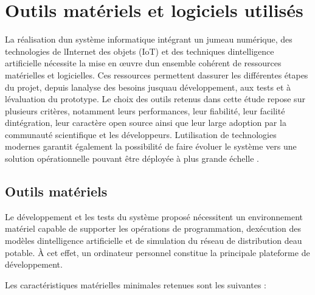 \section{Outils matériels et logiciels utilisés}\label{outils-matuxe9riels-et-logiciels-utilisuxe9s}

La réalisation d\textquotesingle un système informatique intégrant un
jumeau numérique, des technologies de l\textquotesingle Internet des
objets (IoT) et des techniques d\textquotesingle intelligence
artificielle nécessite la mise en œuvre d\textquotesingle un ensemble
cohérent de ressources matérielles et logicielles. Ces ressources
permettent d\textquotesingle assurer les différentes étapes du projet,
depuis l\textquotesingle analyse des besoins jusqu\textquotesingle au
développement, aux tests et à l\textquotesingle évaluation du prototype.
Le choix des outils retenus dans cette étude repose sur plusieurs
critères, notamment leurs performances, leur fiabilité, leur facilité
d\textquotesingle intégration, leur caractère open source ainsi que leur
large adoption par la communauté scientifique et les développeurs.
L\textquotesingle utilisation de technologies modernes garantit
également la possibilité de faire évoluer le système vers une solution
opérationnelle pouvant être déployée à plus grande échelle \cite{ref106}.

\subsection{Outils matériels}\label{outils-matuxe9riels}

Le développement et les tests du système proposé nécessitent un
environnement matériel capable de supporter les opérations de
programmation, d\textquotesingle exécution des modèles
d\textquotesingle intelligence artificielle et de simulation du réseau
de distribution d\textquotesingle eau potable. À cet effet, un
ordinateur personnel constitue la principale plateforme de
développement.

Les caractéristiques matérielles minimales retenues sont les suivantes :

